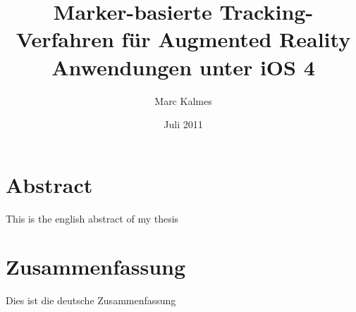%
%




\frontmatter

\ifpdf
{}
\else
{}
\fi

\titlehead{Fachhochschule Köln\\ Fakultät für Informatik und Ingenieurwissenschaften}
\subject{Diplomarbeit}
\title{Marker-basierte Tracking-Verfahren für Augmented Reality Anwendungen unter iOS 4}
\author{Marc Kalmes}
\date{Juli 2011}
\publishers{betreut durch Prof. Dr. Heiner Klocke}

\maketitle

\chapter*{Abstract} %
\label{cha:abstract}
This is the english abstract of my thesis
\chapter*{Zusammenfassung} %
\label{cha:abstract-deu}
Dies ist die deutsche Zusammenfassung

\tableofcontents
\printglossary[style=altlist,title=Glossar]
\printglossary[type=\acronymtype,title=Abkürzungsverzeichnis]

\mainmatter


\nocite{*}

%
\printbibliography[]

\backmatter

